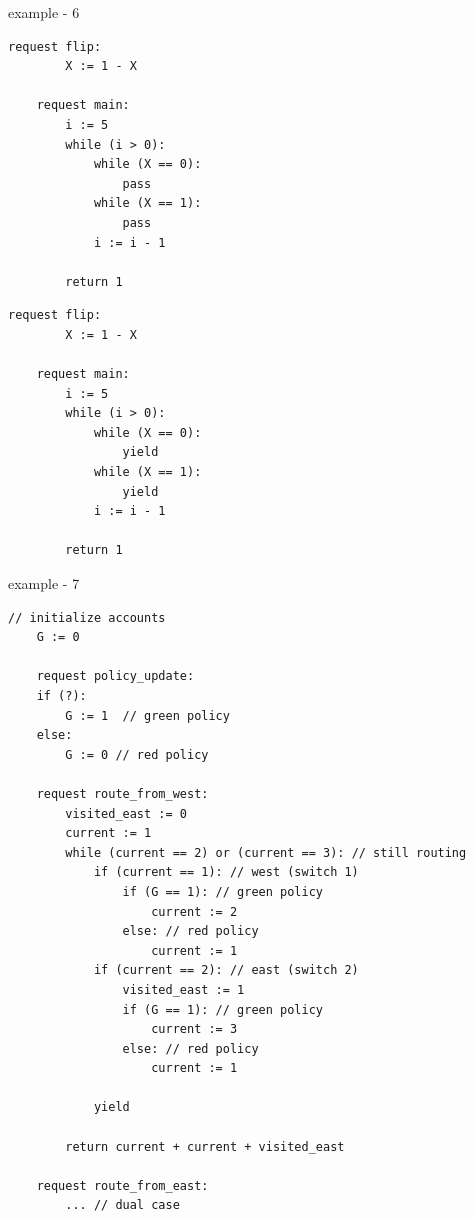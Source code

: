 

example - 6


\noindent
\begin{minipage}[t]{0.45\textwidth}
	\begin{lstlisting}[caption={Complex while (serializable)}]
    request flip: 
        X := 1 - X 
    
    request main:
        i := 5
        while (i > 0):
            while (X == 0):
                pass
            while (X == 1):
                pass
            i := i - 1
        
        return 1       
		\end{lstlisting}
\end{minipage}%
\hfill
\begin{minipage}[t]{0.45\textwidth}
	\begin{lstlisting}[caption={Complex while with yields (not serializable)}]
    request flip: 
        X := 1 - X 

    request main:
        i := 5
        while (i > 0):
            while (X == 0):
                yield
            while (X == 1):
                yield
            i := i - 1

        return 1        
			\end{lstlisting}
\end{minipage}



\newpage

example - 7

\begin{minipage}[t]{1.0\textwidth}
	\begin{lstlisting}[caption={BGP (non serializable --- cycles can appear)}]
    // initialize accounts
    G := 0
    
    request policy_update:
    if (?):
        G := 1  // green policy 
    else:
        G := 0 // red policy
		
    request route_from_west:
        visited_east := 0
        current := 1
        while (current == 2) or (current == 3): // still routing        
            if (current == 1): // west (switch 1)
                if (G == 1): // green policy
                    current := 2
                else: // red policy
                    current := 1
            if (current == 2): // east (switch 2)
                visited_east := 1
                if (G == 1): // green policy
                    current := 3
                else: // red policy
                    current := 1
 
            yield
		
        return current + current + visited_east
        
    request route_from_east:
        ... // dual case     		        
	\end{lstlisting}
\end{minipage}


